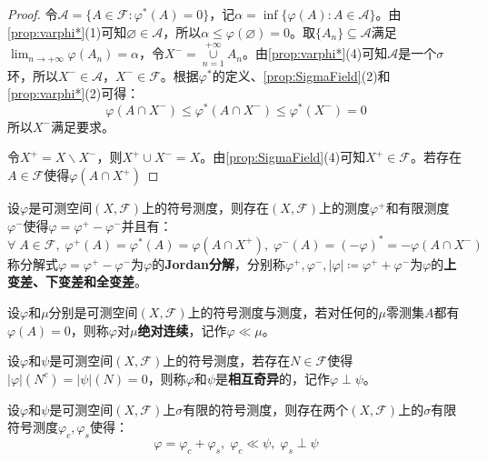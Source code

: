\begin{proof}
	令$\mathscr{A}=\{A\in\mathscr{F}:\varphi^*(A)=0\}$，记$\alpha=\inf\{\varphi(A):A\in\mathscr{A}\}$。由\cref{prop:varphi*}(1)可知$\varnothing\in\mathscr{A}$，所以$\alpha\leqslant\varphi(\varnothing)=0$。取$\{A_n\}\subseteq\mathscr{A}$满足$\lim_{n\to+\infty}\limits\varphi(A_n)=\alpha$，令$X^-=\underset{n=1}{\overset{+\infty}{\cup}}A_n$。由\cref{prop:varphi*}(4)可知$\mathscr{A}$是一个$\sigma$环，所以$X^-\in\mathscr{A}$，$X^-\in\mathscr{F}$。根据$\varphi^*$的定义、\cref{prop:SigmaField}(2)和\cref{prop:varphi*}(2)可得：
	\begin{equation*}
		\varphi(A\cap X^-)\leqslant\varphi^*(A\cap X^-)\leqslant\varphi^*(X^-)=0
	\end{equation*}
	所以$X^-$满足要求。\par
	令$X^+=X\backslash X^-$，则$X^+\cup X^-=X$。由\cref{prop:SigmaField}(4)可知$X^+\in\mathscr{F}$。若存在$A\in\mathscr{F}$使得$\varphi(A\cap X^+)$
\end{proof}
\begin{theorem}
	\label{theo:JordanDecomposition}
	设$\varphi$是可测空间$(X,\mathscr{F})$上的符号测度，则存在$(X,\mathscr{F})$上的测度$\varphi^+$和有限测度$\varphi^-$使得$\varphi=\varphi^+-\varphi^-$并且有：
	\begin{equation*}
		\forall\;A\in\mathscr{F},\;\varphi^+(A)=\varphi^*(A)=\varphi(A\cap X^+),\;\varphi^-(A)=(-\varphi)^*=-\varphi(A\cap X^-)
	\end{equation*}
	称分解式$\varphi=\varphi^+-\varphi^-$为$\varphi$的\textbf{Jordan分解}，分别称$\varphi^+,\varphi^-,|\varphi|\coloneq\varphi^++\varphi^-$为$\varphi$的\textbf{上变差、下变差和全变差}。
\end{theorem}
\begin{definition}
	设$\varphi$和$\mu$分别是可测空间$(X,\mathscr{F})$上的符号测度与测度，若对任何的$\mu$零测集$A$都有$\varphi(A)=0$，则称$\varphi$对$\mu$\textbf{绝对连续}，记作$\varphi\ll\mu$。
\end{definition}
\begin{definition}
	设$\varphi$和$\psi$是可测空间$(X,\mathscr{F})$上的符号测度，若存在$N\in\mathscr{F}$使得$|\varphi|(N^c)=|\psi|(N)=0$，则称$\varphi$和$\psi$是\textbf{相互奇异}的，记作$\varphi\perp\psi$。
\end{definition}
\begin{theorem}
	\label{theo:LebesgueDecomposition}
	设$\varphi$和$\psi$是可测空间$(X,\mathscr{F})$上$\sigma$有限的符号测度，则存在两个$(X,\mathscr{F})$上的$\sigma$有限符号测度$\varphi_c,\varphi_s$使得：
	\begin{equation*}
		\varphi=\varphi_c+\varphi_s,\;\varphi_c\ll\psi,\;\varphi_s\perp\psi
	\end{equation*}
\end{theorem}

